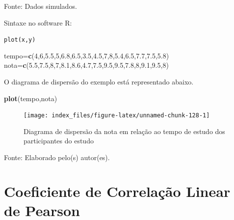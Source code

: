 \documentclass[12pt,brazil,oneside]{book}
\newenvironment{Shaded}{\begin{snugshade}}{\end{snugshade}}
\newcommand{\DecValTok}[1]{\textcolor[rgb]{0.00,0.00,0.81}{#1}}
\newcommand{\FloatTok}[1]{\textcolor[rgb]{0.00,0.00,0.81}{#1}}
\newcommand{\KeywordTok}[1]{\textcolor[rgb]{0.13,0.29,0.53}{\textbf{#1}}}
\newcommand{\NormalTok}[1]{#1}
\begin{document}
Fonte: Dados simulados.

Sintaxe no software R:

\texttt{plot(x,y)}

\begin{Shaded}
\begin{Highlighting}[]
\NormalTok{tempo=}\KeywordTok{c}\NormalTok{(}\DecValTok{4}\NormalTok{,}\DecValTok{6}\NormalTok{,}\FloatTok{5.5}\NormalTok{,}\DecValTok{5}\NormalTok{,}\FloatTok{6.8}\NormalTok{,}\FloatTok{6.5}\NormalTok{,}\FloatTok{3.5}\NormalTok{,}\FloatTok{4.5}\NormalTok{,}\DecValTok{7}\NormalTok{,}\DecValTok{8}\NormalTok{,}\FloatTok{5.4}\NormalTok{,}\FloatTok{6.5}\NormalTok{,}\FloatTok{7.7}\NormalTok{,}\FloatTok{7.5}\NormalTok{,}\FloatTok{5.8}\NormalTok{)}
\NormalTok{nota=}\KeywordTok{c}\NormalTok{(}\FloatTok{5.5}\NormalTok{,}\FloatTok{7.5}\NormalTok{,}\DecValTok{8}\NormalTok{,}\DecValTok{7}\NormalTok{,}\FloatTok{8.1}\NormalTok{,}\FloatTok{8.6}\NormalTok{,}\FloatTok{4.7}\NormalTok{,}\FloatTok{7.5}\NormalTok{,}\FloatTok{9.5}\NormalTok{,}\FloatTok{9.5}\NormalTok{,}\FloatTok{7.8}\NormalTok{,}\DecValTok{8}\NormalTok{,}\FloatTok{9.1}\NormalTok{,}\FloatTok{9.5}\NormalTok{,}\DecValTok{8}\NormalTok{)}
\end{Highlighting}
\end{Shaded}

O diagrama de dispersão do exemplo está representado abaixo.

\begin{Shaded}
\begin{Highlighting}[]
\KeywordTok{plot}\NormalTok{(tempo,nota)}
\end{Highlighting}
\end{Shaded}

\begin{figure}[H]

{\centering \texttt{[image: index\_files/figure-latex/unnamed-chunk-128-1]} 

}

\caption{Diagrama de dispersão da nota em relação ao tempo de estudo dos participantes do estudo}\label{fig:unnamed-chunk-128}
\end{figure}

Fonte: Elaborado pelo(s) autor(es).

\hypertarget{coeficiente-de-correlacao-linear-de-pearson}{%
\section{Coeficiente de Correlação Linear de Pearson}\label{coeficiente-de-correlacao-linear-de-pearson}}
\end{document}
